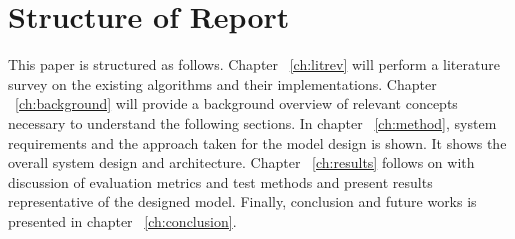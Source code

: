 %
%


\section{Structure of Report}
This paper is structured as follows. Chapter ~\ref{ch:litrev} will perform a
literature survey on the existing algorithms and their implementations. Chapter
~\ref{ch:background}  will provide a background overview of relevant concepts
necessary to understand the following sections. In chapter ~\ref{ch:method},
system requirements and the approach taken for the model design is shown. It
shows the overall system design and architecture.  Chapter ~\ref{ch:results}
follows on with discussion of evaluation metrics and test methods and present
results representative of the designed model. Finally, conclusion and future
works is presented in chapter ~\ref{ch:conclusion}. 



